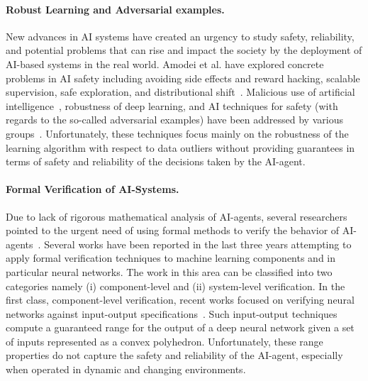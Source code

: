 \paragraph{Robust Learning and Adversarial examples. } New advances in AI systems have created an urgency to study safety, reliability, and potential problems that can rise and impact the society by the deployment of AI-based systems in the real world. Amodei et al. have explored concrete problems in AI safety including avoiding side effects and reward hacking, scalable supervision, safe exploration, and distributional shift~\cite{amodei2016concrete}. Malicious use of artificial intelligence~\cite{brundage2018malicious}, robustness of deep learning, and AI techniques for safety (with regards to the so-called adversarial examples) have been addressed by various groups~\cite{ferdowsi2018robust,everitt2018agi,charikar2017learning,steinhardt2017certified,munoz2017towards,paudice2018label,ruan2018global}. Unfortunately, these techniques focus mainly on the robustness of the learning algorithm with respect to data outliers without providing guarantees in terms of safety and reliability of the decisions taken by the AI-agent.


\paragraph{Formal Verification of AI-Systems. }
Due to lack of rigorous mathematical analysis of AI-agents, several researchers pointed to the urgent need of using formal methods to verify the behavior of AI-agents~\cite{kurd2003establishing,seshia2016towards,seshia2018formal,leikeAIsafety2017,leofante2018automated,scheibler2015towards}.  Several works have been reported in the last three years attempting to apply formal verification techniques to machine learning components and in particular neural networks. The work in this area can be classified into two categories namely (i) component-level and (ii) system-level verification. 
%
In the first class, component-level verification, recent works focused on verifying neural networks against input-output specifications~\cite{katz2017reluplex,ehlers2017formal,bunel2018unified,ruan2018reachability,dutta2017output,pulina2010abstraction}. Such input-output techniques compute a guaranteed range for the output of a deep neural network given a set of inputs represented as a convex polyhedron. Unfortunately, these range properties do not capture the safety and reliability of the AI-agent, especially when operated in dynamic and changing environments.


